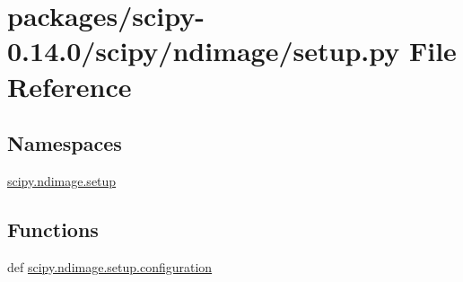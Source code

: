 \hypertarget{packages_2scipy-0_814_80_2scipy_2ndimage_2setup_8py}{}\section{packages/scipy-\/0.14.0/scipy/ndimage/setup.py File Reference}
\label{packages_2scipy-0_814_80_2scipy_2ndimage_2setup_8py}
\subsection*{Namespaces}
\begin{DoxyCompactItemize}
\item 
 \hyperlink{namespacescipy_1_1ndimage_1_1setup}{scipy.\+ndimage.\+setup}
\end{DoxyCompactItemize}
\subsection*{Functions}
\begin{DoxyCompactItemize}
\item 
def \hyperlink{namespacescipy_1_1ndimage_1_1setup_ae2849d17b4c8c1cca0ed094c3c563703}{scipy.\+ndimage.\+setup.\+configuration}
\end{DoxyCompactItemize}
